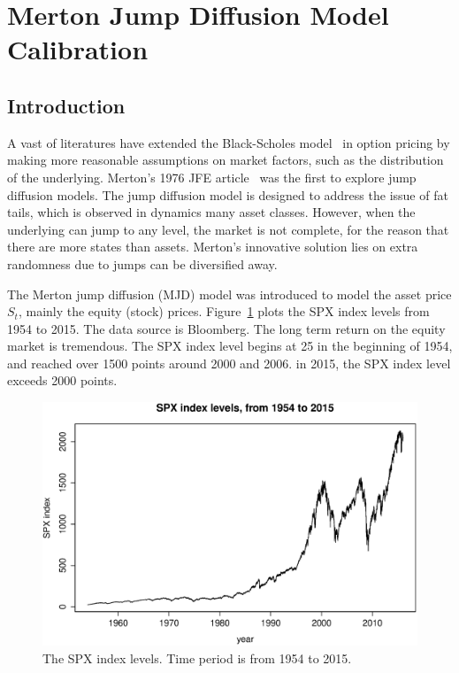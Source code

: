 \documentclass[11pt,reqno,final]{amsart}
\begin{document}
\section{Merton Jump Diffusion Model Calibration}
\subsection{Introduction}
A vast of literatures have extended the Black-Scholes model~\cite{BS73} in option pricing by making more reasonable assumptions on market factors, such as the distribution of the underlying. Merton's 1976 JFE article~\cite{M76} was the first to explore jump diffusion models. The jump diffusion model is designed to address the issue of fat tails, which is observed in dynamics many asset classes. However, when the underlying can jump to any level, the market is not complete, for the reason that there are more states than assets. Merton's innovative solution lies on extra randomness due to jumps can be diversified away.

The Merton jump diffusion (MJD) model was introduced to model the asset price $S_t$, mainly the equity (stock) prices. Figure~\ref{plot_spx} plots the SPX index levels from 1954 to 2015. The data source is Bloomberg. The long term return on the equity market is tremendous. The SPX index level begins at 25 in the beginning of 1954, and reached over 1500 points around 2000 and 2006. in 2015, the SPX index level exceeds 2000 points.

\begin{figure}
  \centering
  \includegraphics[scale=0.6]{plot_spx.eps}
  \caption{The SPX index levels. Time period is from 1954 to 2015.}\label{plot_spx}
\end{figure}
\end{document}
